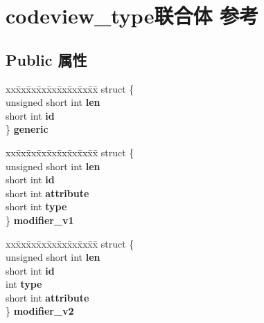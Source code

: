 \hypertarget{unioncodeview__type}{}\section{codeview\+\_\+type联合体 参考}
\label{unioncodeview__type}
\subsection*{Public 属性}
\begin{DoxyCompactItemize}
\item 
\mbox{\label{unioncodeview__type_a0fa976c3227e06b8cd589a4bcfb289ad}} 
\begin{tabbing}
xx\=xx\=xx\=xx\=xx\=xx\=xx\=xx\=xx\=\kill
struct \{\\
\>unsigned short int {\bfseries len}\\
\>short int {\bfseries id}\\
\} {\bfseries generic}\\

\end{tabbing}\item 
\mbox{\label{unioncodeview__type_a06c1a5a7d234b05f28f4087ea7b81bb2}} 
\begin{tabbing}
xx\=xx\=xx\=xx\=xx\=xx\=xx\=xx\=xx\=\kill
struct \{\\
\>unsigned short int {\bfseries len}\\
\>short int {\bfseries id}\\
\>short int {\bfseries attribute}\\
\>short int {\bfseries type}\\
\} {\bfseries modifier\_v1}\\

\end{tabbing}\item 
\mbox{\label{unioncodeview__type_a985b4680053ca076e0e36ccb1d85f928}} 
\begin{tabbing}
xx\=xx\=xx\=xx\=xx\=xx\=xx\=xx\=xx\=\kill
struct \{\\
\>unsigned short int {\bfseries len}\\
\>short int {\bfseries id}\\
\>int {\bfseries type}\\
\>short int {\bfseries attribute}\\
\} {\bfseries modifier\_v2}\\


\end{tabbing}
\end{DoxyCompactItemize}
